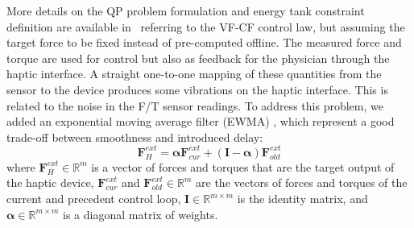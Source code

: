 More details on the QP problem formulation and energy tank constraint definition are available in~\cite{beber2023passive} referring to the VF-CF control law, but assuming the target force to be fixed instead of pre-computed offline.
The measured force and torque are used for control but also as feedback for the physician through the haptic interface. A straight one-to-one mapping of these quantities from the sensor to the device produces some vibrations on the haptic interface. This is related to the noise in the F/T sensor readings. To address this problem, we added an exponential moving average filter (EWMA) \cite{roberts1959}, which represent a good trade-off between smoothness and introduced delay:
\begin{equation}
    \boldsymbol{F}^{ext}_H = \boldsymbol{\alpha} \boldsymbol{F}^{ext}_{cur} + (\boldsymbol{I} - \boldsymbol{\alpha}) \boldsymbol{F}^{ext}_{old} 
\end{equation}
where $\boldsymbol{F}^{ext}_H \in \mathbb{R}^{m}$ is a vector of forces and torques that are the target output of the haptic device, $\boldsymbol{F}^{ext}_{cur}$ and $\boldsymbol{F}^{ext}_{old} \in \mathbb{R}^{m}$ are the vectors of forces and torques of the current and precedent control loop, $\boldsymbol{I} \in \mathbb{R}^{m \times m}$ is the identity matrix, and $\boldsymbol{\alpha} \in \mathbb{R}^{m \times m}$ is a diagonal matrix of weights.
 


  

